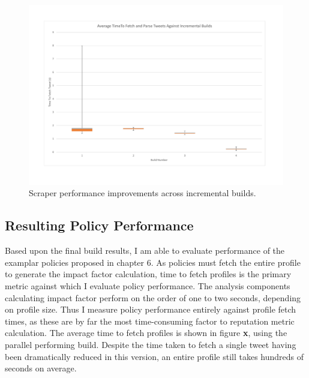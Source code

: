 \begin{center}
\begin{figure}[h!]
\centering
\includegraphics[width=500px]{Images/scrape_performance_against_builds.pdf}
\caption{Scraper performance improvements across incremental builds.}
\end{figure}
\end{center}





\subsection{Resulting Policy Performance}

Based upon the final build results, I am able to evaluate performance of the examplar policies proposed in chapter 6. As policies must fetch the entire profile to generate the impact factor calculation, time to fetch profiles is the primary metric against which I evaluate policy performance. The analysis components calculating impact factor perform on the order of one to two seconds, depending on profile size. Thus I measure policy performance entirely against profile fetch times, as these are by far the most time-consuming factor to reputation metric calculation. The average time to fetch profiles is shown in figure \textbf{x}, using the parallel performing build. Despite the time taken to fetch a single tweet having been dramatically reduced in this version, an entire profile still takes hundreds of seconds on average.


